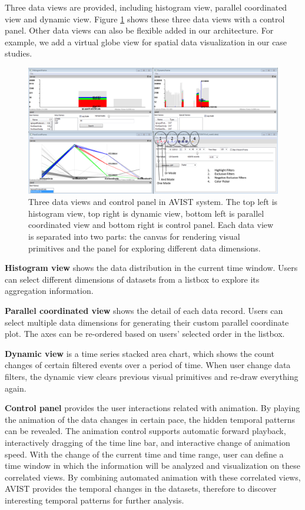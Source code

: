 \documentclass[journal]{vgtc}                %
\begin{document}
{%

Three data views are provided, including histogram view, parallel coordinated view and dynamic view. Figure \ref{fig:views} shows these three data views with a control panel. Other data views can also be flexible added in our architecture. For example, we add a virtual globe view for spatial data visualization in our case studies. 

\begin{figure}[htb]
	\centering
	\includegraphics[width=1.0\linewidth]{pic/DataView.png}
	\parbox[t]{1.0\columnwidth}{\relax
	}
	\caption{\label{fig:views}
		Three data views and control panel in AVIST system. The top left is histogram view, top right is dynamic view, bottom left is parallel coordinated view and bottom right is control panel. Each data view is separated into two parts: the canvas for rendering visual primitives and the panel for exploring different data dimensions.}
\end{figure}  

\textbf{Histogram view} shows the data distribution in the current time window. Users can select different dimensions of datasets from a listbox to explore its aggregation information.

\textbf{Parallel coordinated view} shows the detail of each data record. Users can select multiple data dimensions for generating their custom parallel coordinate plot. The axes can be re-ordered based on users' selected order in the listbox.

\textbf{Dynamic view} is a time series stacked area chart, which shows the count changes of certain filtered events over a period of time. When user change data filters, the dynamic view clears previous visual primitives and re-draw everything again. 

\textbf{Control panel} provides the user interactions related with animation. By playing the animation of the data changes in certain pace, the hidden temporal patterns can be revealed. The animation control supports automatic forward playback, interactively dragging of the time line bar, and interactive change of animation speed. With the change of the current time and time range, user can define a time window in which the information will be analyzed and visualization on these correlated views. By combining automated animation with these correlated views, AVIST provides the temporal changes in the datasets, therefore to discover interesting temporal patterns for further analysis.

}
\end{document}
